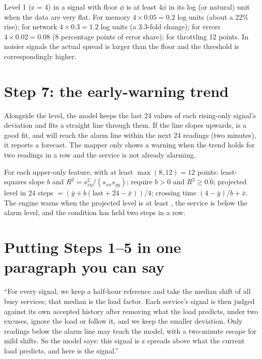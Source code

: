 \begin{techbox}
Level 1 (z = 4) in a signal with floor $\phi$ is at least $4\phi$ in its log (or natural) unit when the data are very flat. For memory $4\times0.05=0.2$ log units (about a 22\% rise); for network $4\times0.3=1.2$ log units (a 3.3-fold change); for errors $4\times0.02=0.08$ (8 percentage points of error share); for throttling 12 points. In noisier signals the actual spread is larger than the floor and the threshold is correspondingly higher.
\end{techbox}

\section{Step 7: the early-warning trend}
\begin{simplebox}
Alongside the level, the model keeps the last 24 values of each rising-only signal's deviation and fits a straight line through them. If the line slopes upwards, is a good fit, and will reach the alarm line within the next 24 readings (two minutes), it reports a forecast. The mapper only shows a warning when the trend holds for two readings in a row and the service is not already alarming.
\end{simplebox}

\begin{techbox}
For each upper-only feature, with at least $\max(8,12)=12$ points: least-squares slope $b$ and $R^2=s_{xy}^2/(s_{xx}s_{yy})$; require $b>0$ and $R^2\ge0.6$; projected level in 24 steps $=(\bar y+b(\text{last}+24-\bar x))/4$; crossing time $(4-\bar y)/b+\bar x$. The engine warns when the projected level is at least , the service is below the alarm level, and the condition has held two steps in a row.
\end{techbox}

\section{Putting Steps 1--5 in one paragraph you can say}
\begin{saybox}
``For every signal, we keep a half-hour reference and take the median shift of all busy services; that median is the load factor. Each service's signal is then judged against its own accepted history after removing what the load predicts, under two excuses, ignore the load or follow it, and we keep the smaller deviation. Only readings below the alarm line may teach the model, with a two-minute escape for mild shifts. So the model says: this signal is z spreads above what the current load predicts, and here is the signal.''
\end{saybox}

